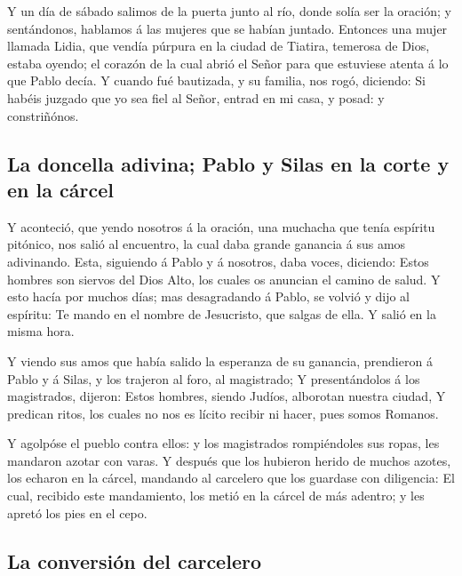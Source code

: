  Y un día de sábado salimos de la puerta junto al río,
donde solía ser la oración; y sentándonos, hablamos á las mujeres que se
habían juntado.  Entonces una mujer llamada Lidia, que
vendía púrpura en la ciudad de Tiatira, temerosa de Dios, estaba oyendo;
el corazón de la cual abrió el Señor para que estuviese atenta á lo que
Pablo decía.  Y cuando fué bautizada, y su familia, nos
rogó, diciendo: Si habéis juzgado que yo sea fiel al Señor, entrad en mi
casa, y posad: y constriñónos.

\hypertarget{la-doncella-adivina-pablo-y-silas-en-la-corte-y-en-la-cuxe1rcel}{%
\subsection{La doncella adivina; Pablo y Silas en la corte y en la
cárcel}\label{la-doncella-adivina-pablo-y-silas-en-la-corte-y-en-la-cuxe1rcel}}

 Y aconteció, que yendo nosotros á la oración, una
muchacha que tenía espíritu pitónico, nos salió al encuentro, la cual
daba grande ganancia á sus amos adivinando.  Esta,
siguiendo á Pablo y á nosotros, daba voces, diciendo: Estos hombres son
siervos del Dios Alto, los cuales os anuncian el camino de salud.
 Y esto hacía por muchos días; mas desagradando á Pablo,
se volvió y dijo al espíritu: Te mando en el nombre de Jesucristo, que
salgas de ella. Y salió en la misma hora.

 Y viendo sus amos que había salido la esperanza de su
ganancia, prendieron á Pablo y á Silas, y los trajeron al foro, al
magistrado;  Y presentándolos á los magistrados, dijeron:
Estos hombres, siendo Judíos, alborotan nuestra ciudad, 
Y predican ritos, los cuales no nos es lícito recibir ni hacer, pues
somos Romanos.

 Y agolpóse el pueblo contra ellos: y los magistrados
rompiéndoles sus ropas, les mandaron azotar con varas.  Y
después que los hubieron herido de muchos azotes, los echaron en la
cárcel, mandando al carcelero que los guardase con diligencia:
 El cual, recibido este mandamiento, los metió en la
cárcel de más adentro; y les apretó los pies en el cepo.

\hypertarget{la-conversiuxf3n-del-carcelero}{%
\subsection{La conversión del
carcelero}\label{la-conversiuxf3n-del-carcelero}}

